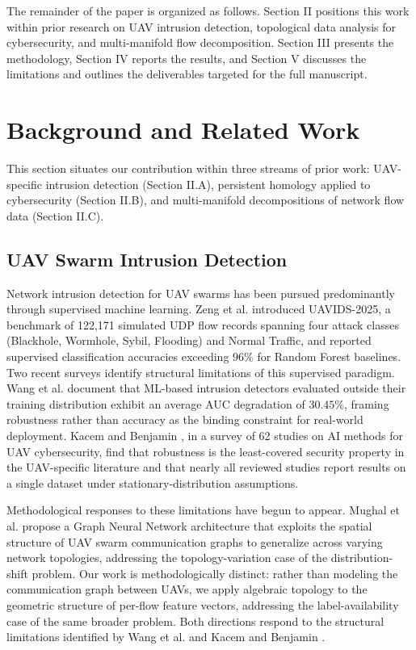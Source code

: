 \documentclass[conf]{new-aiaa}
\begin{document}
The remainder of the paper is organized as follows. Section II positions this work within prior research on UAV intrusion detection, topological data analysis for cybersecurity, and multi-manifold flow decomposition. Section III presents the methodology, Section IV reports the results, and Section V discusses the limitations and outlines the deliverables targeted for the full manuscript.

\section{Background and Related Work}

This section situates our contribution within three streams of prior work: UAV-specific intrusion detection (Section II.A), persistent homology applied to cybersecurity (Section II.B), and multi-manifold decompositions of network flow data (Section II.C).

\subsection{UAV Swarm Intrusion Detection}

Network intrusion detection for UAV swarms has been pursued predominantly through supervised machine learning. Zeng et al. \cite{Zeng} introduced UAVIDS-2025, a benchmark of 122,171 simulated UDP flow records spanning four attack classes (Blackhole, Wormhole, Sybil, Flooding) and Normal Traffic, and reported supervised classification accuracies exceeding $96\%$ for Random Forest baselines. Two recent surveys identify structural limitations of this supervised paradigm. Wang et al. \cite{Wang} document that ML-based intrusion detectors evaluated outside their training distribution exhibit an average AUC degradation of $30.45\%$, framing robustness rather than accuracy as the binding constraint for real-world deployment. Kacem and Benjamin \cite{KacemBenjamin}, in a survey of 62 studies on AI methods for UAV cybersecurity, find that robustness is the least-covered security property in the UAV-specific literature and that nearly all reviewed studies report results on a single dataset under stationary-distribution assumptions.

Methodological responses to these limitations have begun to appear. Mughal et al. \cite{Mughal} propose a Graph Neural Network architecture that exploits the spatial structure of UAV swarm communication graphs to generalize across varying network topologies, addressing the topology-variation case of the distribution-shift problem. Our work is methodologically distinct: rather than modeling the communication graph between UAVs, we apply algebraic topology to the geometric structure of per-flow feature vectors, addressing the label-availability case of the same broader problem. Both directions respond to the structural limitations identified by Wang et al. \cite{Wang} and Kacem and Benjamin \cite{KacemBenjamin}.
\end{document}
